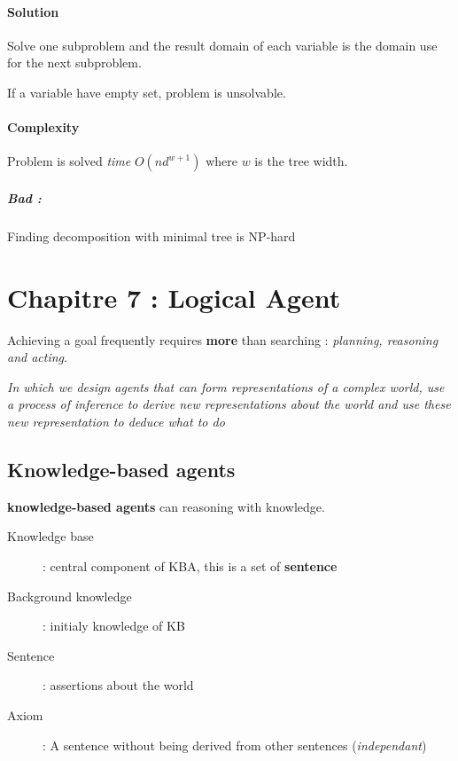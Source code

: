 \paragraph{Solution} Solve one subproblem and the result domain of each
variable is the domain use for the next subproblem.

If a variable have empty set, problem is unsolvable.

\paragraph{Complexity}
Problem is solved \textit{time} $O(nd^{w+1})$ where $w$ is the tree width.

\subparagraph{Bad :} Finding decomposition with minimal tree is NP-hard


\section{Chapitre 7 : Logical Agent}
Achieving a goal frequently requires \textbf{more} than searching : \textit{planning,
reasoning and acting}.

\textit{In which we design agents that can form representations of a complex world, use a process of inference to derive new representations about the world and use these new representation to deduce what to do}

\subsection{Knowledge-based agents}

\textbf{knowledge-based agents} can reasoning with knowledge.

\begin{description}
    \item[Knowledge base] : central component of KBA, this is a set of \textbf{sentence}
    \item[Background knowledge] : initialy knowledge of KB
    \item[Sentence] : assertions about the world
    \item[Axiom] : A sentence without being derived from other sentences (\textit{independant})
\end{description}

